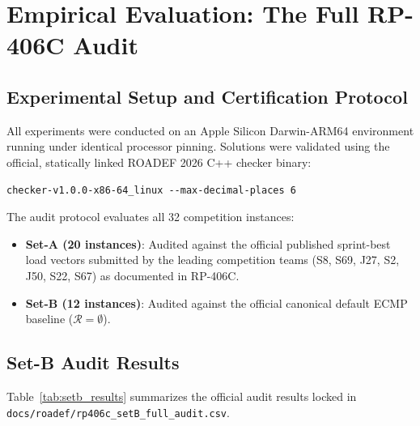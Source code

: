 \documentclass[10pt,journal,compsoc]{IEEEtran}
\begin{document}
\section{Empirical Evaluation: The Full RP-406C Audit}

\subsection{Experimental Setup and Certification Protocol}
All experiments were conducted on an Apple Silicon Darwin-ARM64 environment running under identical processor pinning. Solutions were validated using the official, statically linked ROADEF 2026 C++ checker binary:
\begin{verbatim}
checker-v1.0.0-x86-64_linux --max-decimal-places 6
\end{verbatim}
The audit protocol evaluates all 32 competition instances:
\begin{itemize}
    \item \textbf{Set-A (20 instances)}: Audited against the official published sprint-best load vectors submitted by the leading competition teams (S8, S69, J27, S2, J50, S22, S67) as documented in RP-406C.
    \item \textbf{Set-B (12 instances)}: Audited against the official canonical default ECMP baseline ($\mathcal{R} = \emptyset$).
\end{itemize}

\subsection{Set-B Audit Results}
Table~\ref{tab:setb_results} summarizes the official audit results locked in \texttt{docs/roadef/rp406c\_setB\_full\_audit.csv}.
\end{document}
